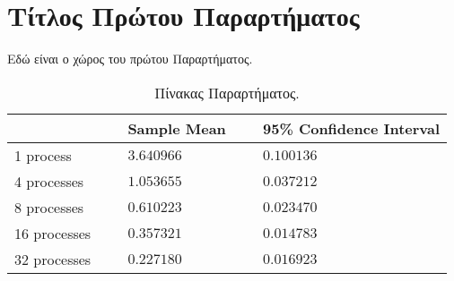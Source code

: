 \chapter{Τίτλος Πρώτου Παραρτήματος}
\label{app:FirstAppendix}

Εδώ είναι ο χώρος του πρώτου Παραρτήματος.

\begin{table}[h]
	\centering
	\caption{Πίνακας Παραρτήματος.}
	\label{tab:AppendixTable}
	\begin{tabular}{l l l l l}
		\hline
		~ & ~ & Sample Mean & ~ & 95\% Confidence Interval \\
		\hline
		1 process & ~ & $3.640966$  & ~ & $0.100136$ \\
		4 processes & ~ & $1.053655$  & ~ & $0.037212$ \\
		8 processes & ~ & $0.610223$  & ~ & $0.023470$ \\
		16 processes & ~ & $0.357321$  & ~ & $0.014783$ \\
		32 processes & ~ & $0.227180$  & ~ & $0.016923$ \\
		\hline
	\end{tabular}
\end{table}

